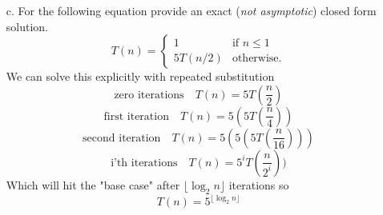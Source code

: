 \documentclass{article}
\begin{document}
\begin{itemize}
\item [c.] For the following equation provide an exact (\emph{not asymptotic}) closed form solution. \\
\begin{equation*}
T(n) =
\begin{cases}
1 &\text{if $n\leq 1$}\\
5T(n/2) &\text{otherwise.}
\end{cases}
\end{equation*}
We can solve this explicitly with repeated substitution
$$\text{zero iterations} \quad T(n) = 5T(\frac{n}{2})$$
$$\text{first iteration} \quad T(n) = 5(5T(\frac{n}{4}))$$
$$\text{second iteration} \quad T(n) = 5(5(5T(\frac{n}{16})))$$
$$\text{i'th iterations} \quad T(n) = 5^iT(\frac{n}{2^i}))$$
Which will hit the "base case" after $\lfloor \log_{2}n \rfloor$ iterations so
$$ T(n) = 5^{\lfloor \log_{2}n \rfloor} $$
\end{itemize}
\end{document}
